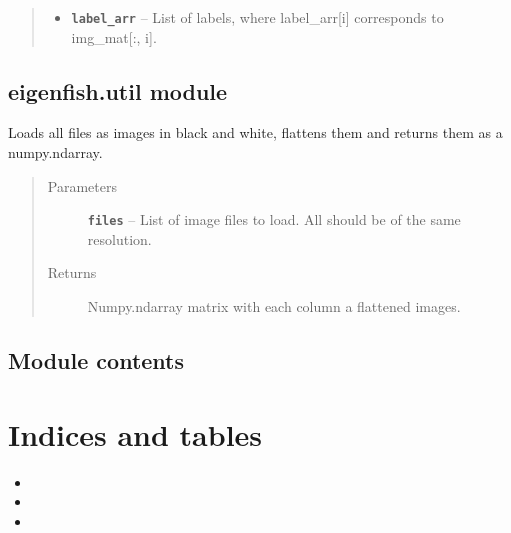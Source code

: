 \documentclass[letterpaper,10pt,english]{sphinxmanual}
\begin{document}
\begin{fulllineitems}
\begin{fulllineitems}
\begin{quote}
\begin{description}
\begin{itemize}
\item {} 
\textbf{\texttt{label\_arr}} -- List of labels, where label\_arr{[}i{]} corresponds to
img\_mat{[}:, i{]}.

\end{itemize}

\end{description}\end{quote}

\end{fulllineitems}


\end{fulllineitems}



\section{eigenfish.util module}
\label{eigenfish:eigenfish-util-module}\label{eigenfish:module-eigenfish.util}

\begin{fulllineitems}
\label{eigenfish:eigenfish.util.load_img_mat}
Loads all files as images in black and white, flattens them and returns them
as a numpy.ndarray.
\begin{quote}\begin{description}
\item[{Parameters}] \leavevmode
\textbf{\texttt{files}} -- List of image files to load. All should be of the same
resolution.

\item[{Returns}] \leavevmode
Numpy.ndarray matrix with each column a flattened images.

\end{description}\end{quote}

\end{fulllineitems}



\section{Module contents}
\label{eigenfish:module-contents}\label{eigenfish:module-eigenfish}

\chapter{Indices and tables}
\label{index:indices-and-tables}\begin{itemize}
\item {} 

\item {} 

\item {} 

\end{itemize}
\end{document}
